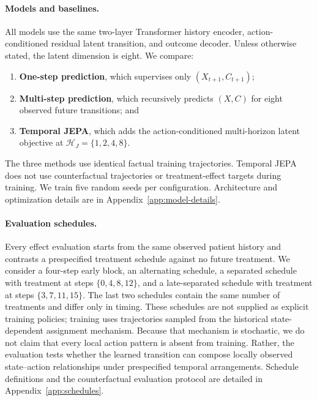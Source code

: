 \paragraph{Models and baselines.}
All models use the same two-layer Transformer history encoder,
action-conditioned residual latent transition, and outcome decoder.
Unless otherwise stated, the latent dimension is eight. We compare:
\begin{enumerate}
    \item \textbf{One-step prediction}, which supervises only
    $(X_{t+1},C_{t+1})$;
    \item \textbf{Multi-step prediction}, which recursively predicts
    $(X,C)$ for eight observed future transitions; and
    \item \textbf{Temporal JEPA}, which adds the action-conditioned
    multi-horizon latent objective at
    $\mathcal H_J=\{1,2,4,8\}$.
\end{enumerate}
The three methods use identical factual training trajectories. Temporal
JEPA does not use counterfactual trajectories or treatment-effect
targets during training. We train five random seeds per configuration.
Architecture and optimization details are in
Appendix~\ref{app:model-details}.

\paragraph{Evaluation schedules.}
Every effect evaluation starts from the same observed patient history
and contrasts a prespecified treatment schedule against no future
treatment. We consider a four-step early block, an alternating schedule,
a separated schedule with treatment at steps $\{0,4,8,12\}$, and a
late-separated schedule with treatment at steps $\{3,7,11,15\}$. The
last two schedules contain the same number of treatments and differ only
in timing. These schedules are not supplied as explicit training
policies; training uses trajectories sampled from the historical
state-dependent assignment mechanism. Because that mechanism is
stochastic, we do not claim that every local action pattern is absent
from training. Rather, the evaluation tests whether the learned
transition can compose locally observed state--action relationships
under prespecified temporal arrangements. Schedule definitions and the
counterfactual evaluation protocol are detailed in
Appendix~\ref{app:schedules}.

